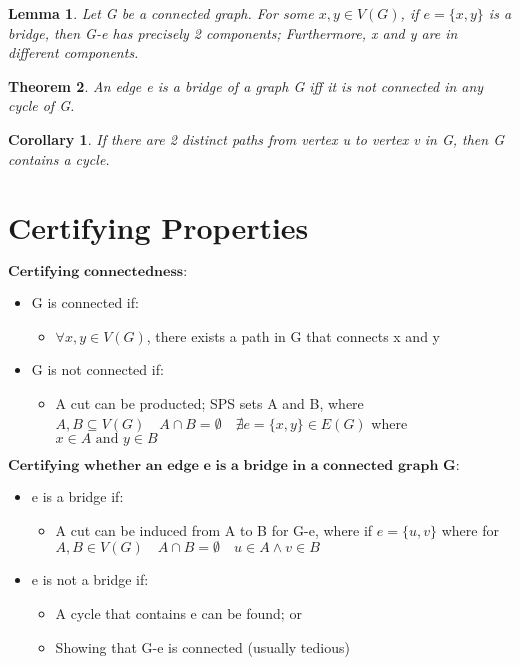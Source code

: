 \documentclass[11pt, oneside]{book}
\theoremstyle{break}
\newtheorem{thm}{Theorem}[section]
\newtheorem{crly}{Corollary}[thm]
\newtheorem{lemma}[thm]{Lemma}
\begin{document}
\begin{lemma}
	Let G be a connected graph. For some $x, y \in V(G)$, if $e=\{x, y\}$ is a bridge, then G-e has precisely 2 components; Furthermore, x and y are in different components.
\end{lemma}

\begin{thm}
	An edge e is a bridge of a graph G iff it is not connected in any cycle of G.
\end{thm}

\begin{crly}
	If there are 2 distinct paths from vertex u to vertex v in G, then G contains a cycle.
\end{crly}


\section{Certifying Properties}
$\textbf{Certifying connectedness:}$
\begin{itemize}
	\item G is connected if:
	\begin{itemize}
		\item $\forall x,y \in V(G)$, there exists a path in G that connects x and y
	\end{itemize}
	\item G is not connected if:
	\begin{itemize}
		\item A cut can be producted; SPS sets A and B, where $A, B \subseteq V(G) \quad A \cap B = \emptyset \quad \nexists e = \{x, y\} \in E(G)$ where $x \in A \text{ and } y \in B$
	\end{itemize}
\end{itemize}


$\textbf{Certifying whether an edge e is a bridge in a connected graph G:}$

\begin{itemize}
	\item e is a bridge if:
	\begin{itemize}
		\item A cut can be induced from A to B for G-e, where if $e=\{u, v\}$ where for $A, B \in V(G) \quad A \cap B = \emptyset \quad u \in A \land v \in B$ 
	\end{itemize}
	\item e is not a bridge if:
	\begin{itemize}
		\item A cycle that contains e can be found; or
		\item Showing that G-e is connected (usually tedious)
	\end{itemize}
\end{itemize}
\end{document}
